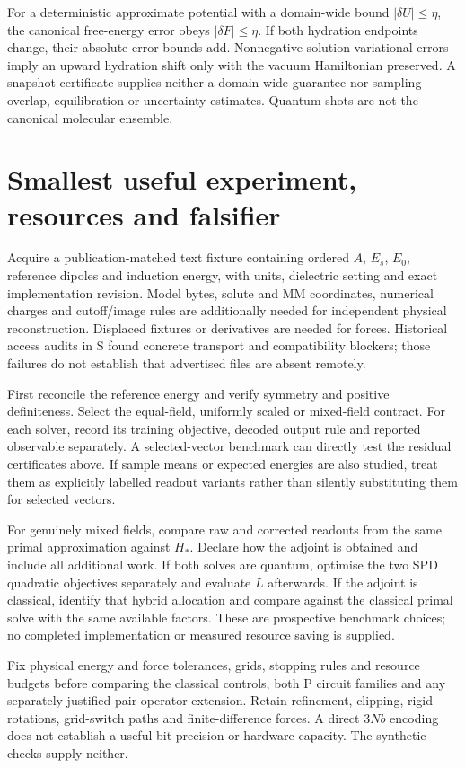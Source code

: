 \documentclass{article}
\begin{document}
For a deterministic approximate potential with a domain-wide bound $|\delta U|\leq\eta$, the canonical free-energy error obeys $|\delta F|\leq\eta$. If both hydration endpoints change, their absolute error bounds add. Nonnegative solution variational errors imply an upward hydration shift only with the vacuum Hamiltonian preserved. A snapshot certificate supplies neither a domain-wide guarantee nor sampling overlap, equilibration or uncertainty estimates. Quantum shots are not the canonical molecular ensemble.

\section{Smallest useful experiment, resources and falsifier}

Acquire a publication-matched text fixture containing ordered $A$, $E_s$, $E_0$, reference dipoles and induction energy, with units, dielectric setting and exact implementation revision. Model bytes, solute and MM coordinates, numerical charges and cutoff/image rules are additionally needed for independent physical reconstruction. Displaced fixtures or derivatives are needed for forces. Historical access audits in S found concrete transport and compatibility blockers; those failures do not establish that advertised files are absent remotely.

First reconcile the reference energy and verify symmetry and positive definiteness. Select the equal-field, uniformly scaled or mixed-field contract. For each solver, record its training objective, decoded output rule and reported observable separately. A selected-vector benchmark can directly test the residual certificates above. If sample means or expected energies are also studied, treat them as explicitly labelled readout variants rather than silently substituting them for selected vectors.

For genuinely mixed fields, compare raw and corrected readouts from the same primal approximation against $H_*$. Declare how the adjoint is obtained and include all additional work. If both solves are quantum, optimise the two SPD quadratic objectives separately and evaluate $L$ afterwards. If the adjoint is classical, identify that hybrid allocation and compare against the classical primal solve with the same available factors. These are prospective benchmark choices; no completed implementation or measured resource saving is supplied.

Fix physical energy and force tolerances, grids, stopping rules and resource budgets before comparing the classical controls, both P circuit families and any separately justified pair-operator extension. Retain refinement, clipping, rigid rotations, grid-switch paths and finite-difference forces. A direct $3Nb$ encoding does not establish a useful bit precision or hardware capacity. The synthetic checks supply neither.
\end{document}
